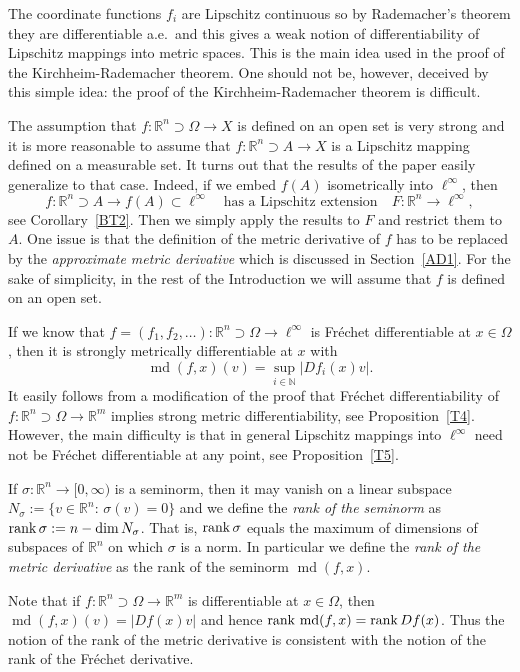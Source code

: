 \documentclass[12pt,leqno]{amsart}
\theoremstyle{definition}
\newcommand{\bbbn}{\mathbb N}
\newcommand{\bbbr}{\mathbb R}
\def\rank{{\rm rank\,}}
\def\md{\operatorname{md}}
\numberwithin{theorem}{section} \numberwithin{equation}{section}
\begin{document}
The coordinate functions $f_i$ are Lipschitz continuous so by Rademacher's theorem they are differentiable a.e.\ and this gives a weak notion of differentiability of Lipschitz mappings into metric spaces. This is the main idea used in the proof of the Kirchheim-Rademacher theorem. One should not be, however, deceived by this simple idea: the proof of the Kirchheim-Rademacher theorem is difficult.

The assumption that $f:\bbbr^n\supset\Omega\to X$ is defined on an open set is very strong and it is more reasonable to assume that $f:\bbbr^n\supset A\to X$ is a Lipschitz mapping defined on a measurable set. It turns out that the results of the paper easily generalize to that case. Indeed, if we embed $f(A)$ isometrically into $\ell^\infty$, then
$$
f:\bbbr^n\supset A\to f(A)\subset\ell^\infty
\quad
\text{has a Lipschitz extension}
\quad
F:\bbbr^n\to \ell^\infty,
$$
see Corollary~\ref{BT2}. Then we simply apply the results to $F$ and restrict them to $A$. One issue is that the definition of the metric derivative of $f$ has to be replaced by the {\em approximate metric derivative} which is discussed in Section~\ref{AD1}. For the sake of simplicity, in the rest of the Introduction we will assume that $f$ is defined on an open set.

If we know that $f=(f_1,f_2,\ldots):\bbbr^n\supset\Omega\to\ell^\infty$ is Fr\'echet differentiable at $x\in\Omega$, then it is strongly metrically differentiable at $x$ with
$$
\md(f,x)(v)=\sup_{i\in \bbbn}|Df_i(x)v|.
$$
It easily follows from a modification of the proof that Fr\'echet differentiability of $f:\bbbr^n\supset\Omega\to\bbbr^m$ implies strong metric differentiability, see Proposition~\ref{T4}. However, the main difficulty is that in general Lipschitz mappings into $\ell^\infty$ need not be Fr\'echet differentiable at any point, see Proposition~\ref{T5}.


If $\sigma:\bbbr^n\to [0,\infty)$ is a seminorm, then it may vanish on a linear subspace $N_\sigma:=\{v\in \bbbr^n:\, \sigma(v)=0\}$ and we define the {\em rank of the seminorm} as $\rank\sigma:=n-\dim N_\sigma$. That is, $\rank\sigma$ equals the maximum of dimensions of subspaces of $\bbbr^n$ on which $\sigma$ is a norm.
In particular we define the {\em rank of the metric derivative} as the rank of the seminorm $\md(f,x)$.

Note that if $f:\bbbr^n\supset\Omega\to\bbbr^m$ is differentiable at $x\in\Omega$, then $\md(f,x)(v)=|Df(x)v|$ and hence
$\rank\md(f,x)=\rank Df(x)$. Thus the notion of the rank of the metric derivative is consistent with the notion of the rank of the Fr\'echet derivative.
\end{document}
